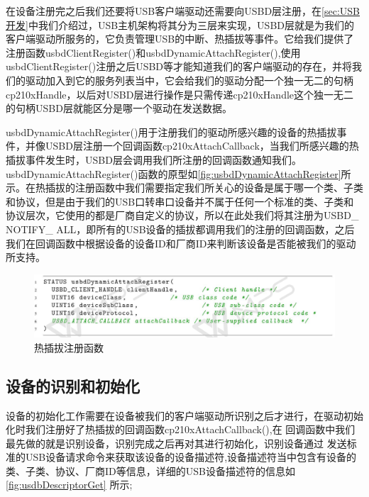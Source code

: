 	在设备注册完之后我们还要将USB客户端驱动还需要向USBD层注册，在\autoref{sec:USB开发}中我们介绍过，USB主机架构将其分为三层来实现，USBD层就是为我们的客户端驱动所服务的，它负责管理USB的中断、热插拔等事件。它给我们提供了注册函数usbdClientRegister()和usbdDynamicAttachRegister(),使用usbdClientRegister()注册之后USBD等才能知道我们的客户端驱动的存在，并将我们的驱动加入到它的服务列表当中，它会给我们的驱动分配一个独一无二的句柄cp210xHandle，以后对USBD层进行操作是只需传递cp210xHandle这个独一无二的句柄USBD层就能区分是哪一个驱动在发送数据。
	
	usbdDynamicAttachRegister()用于注册我们的驱动所感兴趣的设备的热插拔事件，并像USBD层注册一个回调函数cp210xAttachCallback，当我们所感兴趣的热插拔事件发生时，USBD层会调用我们所注册的回调函数通知我们。usbdDynamicAttachRegister()函数的原型如\autoref{fig:usbdDynamicAttachRegister}所示。在热插拔的注册函数中我们需要指定我们所关心的设备是属于哪一个类、子类和协议，但是由于我们的USB口转串口设备并不属于任何一个标准的类、子类和协议层次，它使用的都是厂商自定义的协议，所以在此处我们将其注册为USBD\_ NOTIFY\_ ALL，即所有的USB设备的插拔都调用我们的注册的回调函数，之后我们在回调函数中根据设备的设备ID和厂商ID来判断该设备是否能被我们的驱动所支持。
\begin{figure}[!h]
\centering
\includegraphics[width=1.0\textwidth]{./graphics/usbdDynamicAttachRegister.pdf}
\caption{热插拔注册函数}\label{fig:usbdDynamicAttachRegister}
\end{figure}


\subsection{设备的识别和初始化}

	设备的初始化工作需要在设备被我们的客户端驱动所识别之后才进行，在驱动初始化时我们注册好了热插拔的回调函数cp210xAttachCallback(),在
	回调函数中我们最先做的就是识别设备，识别完成之后再对其进行初始化，识别设备通过
	发送标准的USB设备请求命令来获取该设备的设备描述符,设备描述符当中包含有设备的类、子类、协议、厂商ID等信息，详细的USB设备描述符的信息如\autoref{fig:usdbDescriptorGet} 所示;

